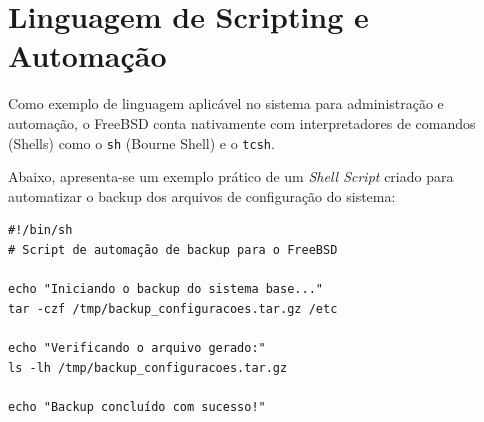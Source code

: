 \documentclass[12pt]{article}
\begin{document}
\section{Linguagem de Scripting e Automação}
Como exemplo de linguagem aplicável no sistema para administração e automação, o FreeBSD conta nativamente com interpretadores de comandos (Shells) como o \texttt{sh} (Bourne Shell) e o \texttt{tcsh}. 

Abaixo, apresenta-se um exemplo prático de um \textit{Shell Script} criado para automatizar o backup dos arquivos de configuração do sistema:

\begin{verbatim}
#!/bin/sh
# Script de automação de backup para o FreeBSD

echo "Iniciando o backup do sistema base..."
tar -czf /tmp/backup_configuracoes.tar.gz /etc

echo "Verificando o arquivo gerado:"
ls -lh /tmp/backup_configuracoes.tar.gz

echo "Backup concluído com sucesso!"
\end{verbatim}
\end{document}
